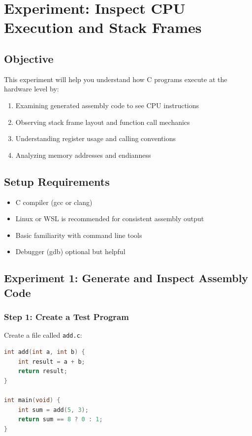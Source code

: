 \chapter{Experiment: Inspect CPU Execution and Stack Frames}

\section{Objective}

This experiment will help you understand how C programs execute at the hardware level by:
\begin{enumerate}
\item Examining generated assembly code to see CPU instructions
\item Observing stack frame layout and function call mechanics
\item Understanding register usage and calling conventions
\item Analyzing memory addresses and endianness
\end{enumerate}

\section{Setup Requirements}

\begin{itemize}
\item C compiler (gcc or clang)
\item Linux or WSL is recommended for consistent assembly output
\item Basic familiarity with command line tools
\item Debugger (gdb) optional but helpful
\end{itemize}

\section{Experiment 1: Generate and Inspect Assembly Code}

\subsection{Step 1: Create a Test Program}

Create a file called \texttt{add.c}:

\begin{lstlisting}[language=C]
int add(int a, int b) {
    int result = a + b;
    return result;
}

int main(void) {
    int sum = add(5, 3);
    return sum == 8 ? 0 : 1;
}
\end{lstlisting}


